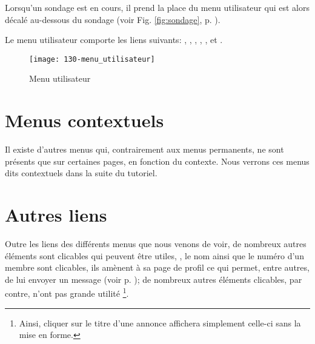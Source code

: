 Lorsqu'un sondage est en cours, il prend la place du menu utilisateur qui est alors décalé au-dessous du sondage (voir Fig. \ref{fig:sondage}, p. \pageref{fig:sondage}).

Le menu utilisateur comporte les liens suivants: ,
, , , ,  et .
\begin{figure}
    \centering
    \texttt{[image: 130-menu\_utilisateur]}
    \caption{Menu utilisateur}
    \label{fig:menuUtilisateur}
\end{figure}

\section{Menus contextuels}

Il existe d’autres menus qui, contrairement aux menus permanents, ne sont présents que sur certaines pages, \cad{} en fonction du contexte. Nous verrons ces menus dits contextuels dans la suite du tutoriel.

\section{Autres liens}\label{page:autresLiens}

Outre les liens des différents menus que nous venons de voir, de nombreux autres éléments sont clicables qui peuvent être utiles, \ex, le nom ainsi que le numéro d'un membre sont clicables, ils amènent à sa page de profil ce qui permet, entre autres, de lui envoyer un message (voir p. \pageref{page:envoyerCourrielMembre}); de nombreux autres éléments clicables, par contre, n’ont pas grande utilité%
\footnote{Ainsi, cliquer sur le titre d'une annonce affichera simplement celle-ci sans la mise en forme.}.
